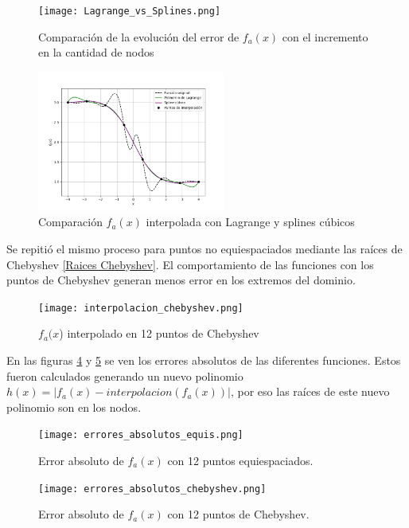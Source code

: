 \documentclass[12pt,a4]{article} %
\begin{document}
\begin{multicols}{2}
\begin{figure}[H]
    \centering
    \texttt{[image: Lagrange\_vs\_Splines.png]}
    \caption{Comparación de la evolución del error de $f_a(x)$ con el incremento en la cantidad de nodos}
    \label{fig:lagrange_splines_errors}
\end{figure}


\begin{figure}[H]
    \centering
    \includegraphics[width=0.55\textwidth]{lagrange_splines_equidistantes.png}
    \caption{Comparación $f_a(x)$ interpolada con Lagrange y splines cúbicos}
    \label{fig:lagrange_splines}
\end{figure}
Se repitió el mismo proceso para puntos no equiespaciados mediante las raíces de Chebyshev \eqref{Raices Chebyshev}. El comportamiento de las funciones con los puntos de Chebyshev generan menos error en los extremos del dominio. 
\begin{figure}[H]
    \centering
    \texttt{[image: interpolacion\_chebyshev.png]}
    \caption{$f_a(x$) interpolado en 12 puntos de Chebyshev}
    \label{fig:cheby points}
\end{figure}
En las figuras \ref{fig:error absoluto equi} y \ref{fig:error absoluto Cheb} se ven los errores absolutos de las diferentes funciones. Estos fueron calculados generando un nuevo polinomio $h(x) = |f_a(x)-interpolacion(f_a(x))|$, por eso las raíces de este nuevo polinomio son en los nodos. 

\begin{figure}[H]
    \centering
    \texttt{[image: errores\_absolutos\_equis.png]}
    \caption{Error absoluto de $f_a(x)$ con 12 puntos equiespaciados.}
    \label{fig:error absoluto equi}
\end{figure}

\begin{figure}[H]
    \centering
    \texttt{[image: errores\_absolutos\_chebyshev.png]}
    \caption{Error absoluto de $f_a(x)$ con 12 puntos de Chebyshev.}
    \label{fig:error absoluto Cheb}
\end{figure}


\end{multicols}
\end{document}
